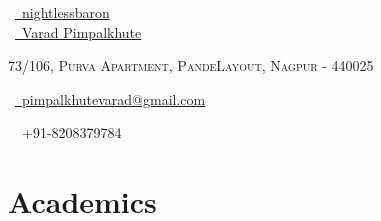\documentclass[a4paper,10pt]{extarticle} %
\begin{document}
\pagestyle{empty} %


\begin{multicols}{3}
\normalsize \faGithub\ {\href{https://github.com/nightlessbaron}{\  nightlessbaron}}\\
\normalsize  \faLinkedinSquare\ {\href{https://www.linkedin.com/in/varad-pimpalkhute-a526a9167/}{\  Varad Pimpalkhute}}\\
\columnbreak
\normalsize\par{\centering{\huge\textsc{\textcolor{primary}{Varad Pimpalkhute}}}\par} %
\par{\centering\normalsize {\textsc{73/106, Purva Apartment, PandeLayout, Nagpur - 440025}}\hfill\par}
\columnbreak
\raggedright\hfill\normalsize \faEnvelope\ {\href{mailto:pimpalkhutevarad@gmail.com}{\  pimpalkhutevarad@gmail.com}}\\
\raggedright\hfill{\faPhone\ \  +91-8208379784}
\end{multicols}


\vspace{-0.6cm}
\section{\textcolor{primary}{Academics}}
\end{document}
